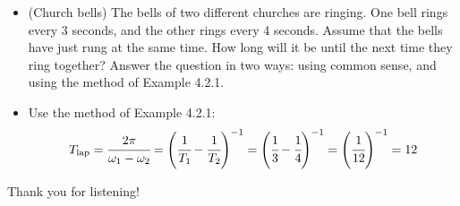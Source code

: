\documentclass[10pt,aspectratio=43,mathserif,table]{beamer}
\begin{document}
\begin{frame}
	
	\begin{itemize}
		\item (Church bells) The bells of two different churches are ringing. One bell rings every 3 seconds, and the other rings every 4 seconds. Assume that the bells have just rung at the same time. How long will it be until the next time they ring together? Answer the question in two ways: using common sense, and using the method of Example 4.2.1.
		\item Use the method of Example 4.2.1:
		$$
		T_{\mathrm{lap}}=\cfrac{2\pi}{\omega_1 - \omega_2} 
		= \left(\cfrac{1}{T_1} - \cfrac{1}{T_2}\right)^{-1} 
		= \left(\cfrac{1}{3} - \cfrac{1}{4}\right)^{-1}
		= \left(\cfrac{1}{12}\right)^{-1} = 12
		$$
	\end{itemize}

\end{frame}


\begin{frame}
	\LARGE \centering Thank you for listening!
\end{frame}
\end{document}
